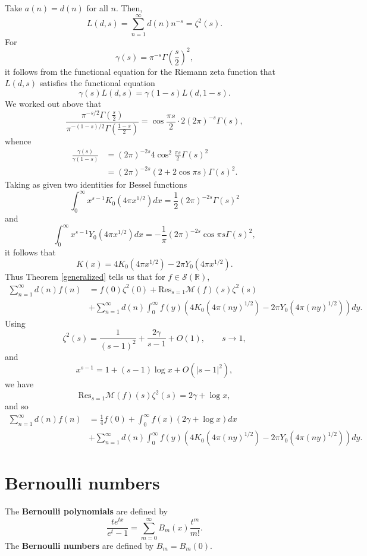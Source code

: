\documentclass{article}
\newcommand{\Res}{\mathrm{Res}}
\begin{document}
Take $a(n)=d(n)$ for all $n$. Then,
\[
L(d,s) = \sum_{n=1}^\infty d(n) n^{-s} =  \zeta^2(s).
\]
For
\[
\gamma(s) = \pi^{-s} \Gamma\left( \frac{s}{2} \right)^2,
\]
it follows from the functional equation for the Riemann zeta function that
$L(d,s)$ satisfies the functional equation
\[
\gamma(s) L(d,s) = \gamma(1-s)L(d,1-s).
\]
We worked out above that
\[
\frac{\pi^{-s/2} \Gamma\left( \frac{s}{2} \right)}{\pi^{-(1-s)/2} \Gamma\left( \frac{1-s}{2} \right)} = \cos \frac{\pi s}{2} \cdot 2 (2\pi)^{-s} \Gamma(s),
\]
whence
\begin{align*}
\frac{\gamma(s)}{\gamma(1-s)} &=  (2\pi)^{-2s} 4\cos^2 \frac{\pi s}{2}  \Gamma(s)^2\\
&=(2\pi)^{-2s}(2+2\cos \pi s) \Gamma(s)^2.
\end{align*}
Taking as given two identities for Bessel functions
\[
\int_0^\infty x^{s-1} K_0(4\pi x^{1/2}) dx = \frac{1}{2}(2\pi)^{-2s} \Gamma(s)^2
\]
and
\[
\int_0^\infty x^{s-1} Y_0(4\pi x^{1/2}) dx = -\frac{1}{\pi} (2\pi)^{-2s} \cos \pi s \Gamma(s)^2,
\]
it follows that
\[
K(x) = 4K_0(4\pi x^{1/2}) - 2\pi Y_0(4\pi x^{1/2}).
\]
Thus Theorem \ref{generalized} tells us that for $f \in \mathscr{S}(\mathbb{R})$,
\begin{align*}
\sum_{n=1}^\infty d(n) f(n)&=f(0) \zeta^2(0) +
\Res_{s=1}  \mathscr{M}(f)(s)\zeta^2(s)\\
&+ \sum_{n=1}^\infty d(n) \int_0^\infty f(y) 
\left( 4K_0(4\pi (ny)^{1/2}) - 2\pi Y_0(4\pi (ny)^{1/2}) \right) dy.
\end{align*}
Using
\[
\zeta^2(s) = \frac{1}{(s-1)^2}+\frac{2\gamma}{s-1}+O(1), \qquad s \to 1,
\]
and
\[
x^{s-1} = 1+ (s-1) \log x + O(|s-1|^2),
\]
we have 
\[
\Res_{s=1} \mathscr{M}(f)(s)\zeta^2(s)=2\gamma+\log x,
\]
and so
\begin{align*}
\sum_{n=1}^\infty d(n) f(n)&=\frac{1}{4} f(0) +
\int_0^\infty f(x)(2\gamma+\log x) dx
\\
&+ \sum_{n=1}^\infty d(n) \int_0^\infty f(y) 
\left( 4K_0(4\pi (ny)^{1/2}) - 2\pi Y_0(4\pi (ny)^{1/2}) \right) dy.
\end{align*}



\section{Bernoulli numbers}
The \textbf{Bernoulli polynomials} are defined by
\[
\frac{te^{tx}}{e^t-1} = \sum_{m=0}^\infty B_m(x) \frac{t^m}{m!}.
\]
The \textbf{Bernoulli numbers} are defined by $B_m=B_m(0)$. 
\end{document}
